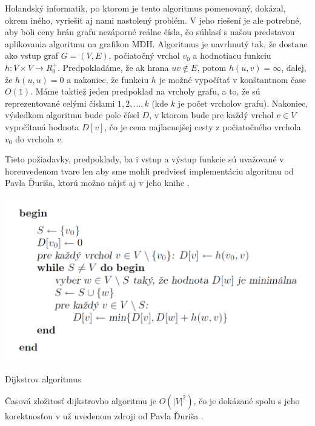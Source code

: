 Holandský informatik, po ktorom je tento algoritmus pomenovaný, dokázal, okrem iného, vyriešiť aj nami nastolený problém. V jeho riešení je ale potrebné, aby boli ceny hrán grafu nezáporné reálne čísla, čo súhlasí s našou predstavou aplikovania algoritmu na grafikon MDH. Algoritmus je navrhnutý tak, že dostane ako vstup graf $G = (V, E)$, počiatočný vrchol $v_{0}$ a hodnotiacu funkciu $h: V \times V \rightarrow R^{+}_{0}$. Predpokladáme, že ak hrana $uv \notin E$, potom $h(u,v) = \infty$, ďalej, že $h(u,u) = 0$ a nakoniec, že funkciu $h$ je možné vypočítať v konštantnom čase $O(1)$. Máme taktiež jeden predpoklad na vrcholy grafu, a to, že sú reprezentované celými číslami $1, 2, ... , k$ (kde $k$ je počet vrcholov grafu). Nakoniec, výsledkom algoritmu bude pole čísel $D$, v ktorom bude pre každý vrchol $v \in V$ vypočítaná hodnota $D [v]$, čo je cena najlacnejšej cesty z počiatočného vrchola $v_{0}$ do vrchola $v$.\newline

Tieto požiadavky, predpoklady, ba i vstup a výstup funkcie sú uvažované v horeuvedenom tvare len aby sme mohli predviesť implementáciu algoritmu od Pavla Ďuriša, ktorú možno nájsť aj v jeho knihe \cite[kapitola 2.2.1]{duris2009}.\newline

\begin{algorithm}[H]
  \includegraphics[width=\linewidth]{./images/Alg_Dijkstra.png}
  \caption{Dijkstrov algoritmus}
  \label{Alg_Dijkstra}
  \centering
\end{algorithm}

Časová zložitosť dijkstrovho algoritmu je $O(|V|^{2})$, čo je dokázané spolu s jeho korektnosťou v už uvedenom zdroji od Pavla Ďuriša \cite[kapitola 2.2.1]{duris2009}.\newline

